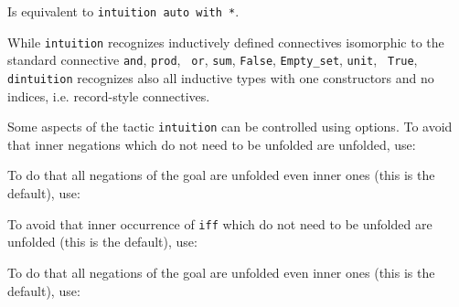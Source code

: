 \begin{Variants}
\item {}

  Is equivalent to {\tt intuition auto with *}.

\item {}

  While {\tt intuition} recognizes inductively defined connectives
  isomorphic to the standard connective {\tt and}, {\tt prod}, {\tt
    or}, {\tt sum}, {\tt False}, {\tt Empty\_set}, {\tt unit}, {\tt
    True}, {\tt dintuition} recognizes also all inductive types with
  one constructors and no indices, i.e. record-style connectives.

\end{Variants}


Some aspects of the tactic {\tt intuition} can be
controlled using options. To avoid that inner negations which do not
need to be unfolded are unfolded, use:

\begin{quote}
{}
\end{quote}

To do that all negations of the goal are unfolded even inner ones
(this is the default), use:

\begin{quote}
{}
\end{quote}

To avoid that inner occurrence of {\tt iff} which do not need to be
unfolded are unfolded (this is the default), use:

\begin{quote}
{}
\end{quote}

To do that all negations of the goal are unfolded even inner ones
(this is the default), use:

\begin{quote}
{}
\end{quote}



\subsection{}
\label{rtauto}

